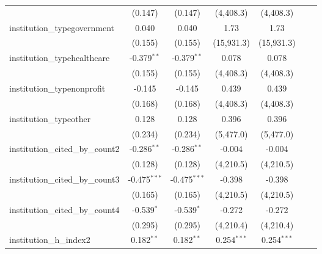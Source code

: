 \begin{tabular}{lcccccc}
                                         & (0.147)        & (0.147)        & (4,408.3)     & (4,408.3)     &     &   \\   
   institution\_typegovernment           & 0.040          & 0.040          & 1.73          & 1.73          &     &   \\   
                                         & (0.155)        & (0.155)        & (15,931.3)    & (15,931.3)    &     &   \\   
   institution\_typehealthcare           & -0.379$^{**}$  & -0.379$^{**}$  & 0.078         & 0.078         &     &   \\   
                                         & (0.155)        & (0.155)        & (4,408.3)     & (4,408.3)     &     &   \\   
   institution\_typenonprofit            & -0.145         & -0.145         & 0.439         & 0.439         &     &   \\   
                                         & (0.168)        & (0.168)        & (4,408.3)     & (4,408.3)     &     &   \\   
   institution\_typeother                & 0.128          & 0.128          & 0.396         & 0.396         &     &   \\   
                                         & (0.234)        & (0.234)        & (5,477.0)     & (5,477.0)     &     &   \\   
   institution\_cited\_by\_count2        & -0.286$^{**}$  & -0.286$^{**}$  & -0.004        & -0.004        &     &   \\   
                                         & (0.128)        & (0.128)        & (4,210.5)     & (4,210.5)     &     &   \\   
   institution\_cited\_by\_count3        & -0.475$^{***}$ & -0.475$^{***}$ & -0.398        & -0.398        &     &   \\   
                                         & (0.165)        & (0.165)        & (4,210.5)     & (4,210.5)     &     &   \\   
   institution\_cited\_by\_count4        & -0.539$^{*}$   & -0.539$^{*}$   & -0.272        & -0.272        &     &   \\   
                                         & (0.295)        & (0.295)        & (4,210.4)     & (4,210.4)     &     &   \\   
   institution\_h\_index2                & 0.182$^{**}$   & 0.182$^{**}$   & 0.254$^{***}$ & 0.254$^{***}$ &     &   \\   

\end{tabular}
